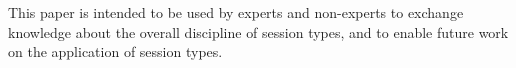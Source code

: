This paper is intended to be used by experts and non-experts
to exchange knowledge about the overall discipline of session types,
and to enable future work on the application of session types.


\begin{comment}
\subsection{Overview of the paper}

The paper begins in \secref{preliminaries}
with the definition of the basic terms and notions
that are used throughout the paper for the exhibition of the usecase
results.

The usecases that are presented in the paper are compiled by the researchers
working on the ABCD project and can be found in the ABCD online repository~\cite{usecase_repository}.
In \secref{usecases} there is a summary presentation
of the usecases in the online repository that gives an overview
for each usecase and discusses its design and implementation specifics
as well as the features that are being demonstrated.

In \secref{presentation} there is the selection of two
usecases from the online repository in order to demonstrate
some of the basic notions of the application of session types.
The first example is an example of an online book-store,
where two buyers want to share the expenses to buy a book.
The online book-store is consider in the bibliography as the
standard example for the presentation session types.
It first demonstrates the basic send receive operations
between multiple entities in a concurrent protocol. A second
feature is the fact that it demonstrate in a comprehensive
way the interaction logic between the entities.
The implementation of the book-store usecase using different
technologies gives a further insight to the applicability of
session types.
The second usecase presented in full is the design and implementation
of the Simple Mail Transfer Protocol~\cite{citation_needed} (SMTP),
as a way to demonstrate how session types cope with real network
protocols. SMTP is a protocol based on states. The increased complexity
of states makes the design and implementation of the SMTP a demanding
procedure. The paper claims that the use of session types can reduce
the demands of the implementation of SMTP.

\secref{engineering} makes a summary of the software engineering
practices that are identified... \dk{put more}
\end{comment}


